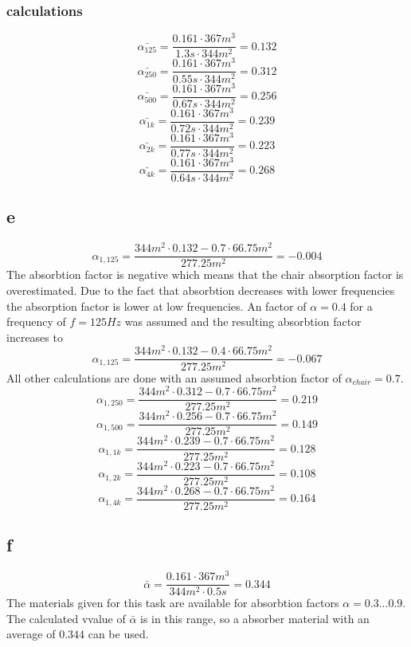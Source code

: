 \documentclass{article}
\begin{document}
\subsubsection{calculations}
$$\bar{\alpha_{125}}=\frac{0.161\cdot 367m^3}{1.3s\cdot 344m^2}=0.132$$
$$\bar{\alpha_{250}}=\frac{0.161\cdot 367m^3}{0.55s\cdot 344m^2}=0.312$$
$$\bar{\alpha_{500}}=\frac{0.161\cdot 367m^3}{0.67s\cdot 344m^2}=0.256$$
$$\bar{\alpha_{1k}}=\frac{0.161\cdot 367m^3}{0.72s\cdot 344m^2}=0.239$$
$$\bar{\alpha_{2k}}=\frac{0.161\cdot 367m^3}{0.77s\cdot 344m^2}=0.223$$
$$\bar{\alpha_{4k}}=\frac{0.161\cdot 367m^3}{0.64s\cdot 344m^2}=0.268$$
\subsection{e}
$$\alpha_{1,125}=\frac{344m^2\cdot 0.132-0.7\cdot 66.75m^2}{277.25m^2}=-0.004$$
The absorbtion factor is negative which means that the chair absorption factor is overestimated. Due to the fact that absorbtion decreases with lower frequencies the absorption factor is lower at low frequencies.  An factor of $\alpha=0.4$ for a frequency of $f=125Hz$ was assumed and the resulting absorbtion factor increases to
 $$\alpha_{1,125}=\frac{344m^2\cdot 0.132-0.4\cdot 66.75m^2}{277.25m^2}=-0.067$$
All other calculations are done with an assumed absorbtion factor of $\alpha_{chair}=0.7$.
 $$\alpha_{1,250}=\frac{344m^2\cdot 0.312-0.7\cdot 66.75m^2}{277.25m^2}=0.219$$
 $$\alpha_{1,500}=\frac{344m^2\cdot 0.256-0.7\cdot 66.75m^2}{277.25m^2}=0.149$$
 $$\alpha_{1,1k}=\frac{344m^2\cdot 0.239-0.7\cdot 66.75m^2}{277.25m^2}=0.128$$
 $$\alpha_{1,2k}=\frac{344m^2\cdot 0.223-0.7\cdot 66.75m^2}{277.25m^2}=0.108$$
 $$\alpha_{1,4k}=\frac{344m^2\cdot 0.268-0.7\cdot 66.75m^2}{277.25m^2}=0.164$$
\subsection{f}
$$\bar{\alpha}=\frac{0.161\cdot 367m^3}{344m^2\cdot 0.5s}=0.344$$
The materials given for this task are available for absorbtion factors $\alpha=0.3 ... 0.9$. The calculated vvalue of $\bar{\alpha}$ is in this range, so a absorber material with an average of $0.344$ can be used.
\end{document}
